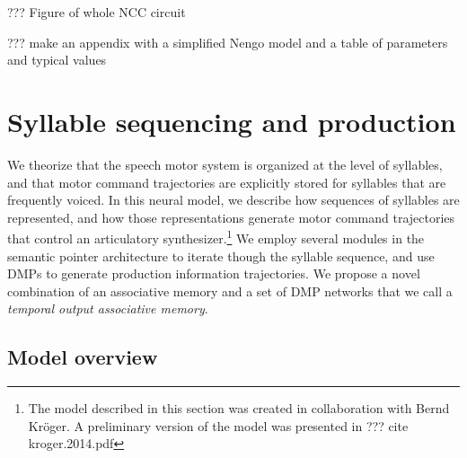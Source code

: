 ??? Figure of whole NCC circuit


??? make an appendix with a simplified Nengo model
and a table of parameters and typical values

\section{Syllable sequencing and production}


We theorize that the speech motor system
is organized at the level of syllables,
and that motor command trajectories are explicitly stored
for syllables that are frequently voiced.
In this neural model,
we describe how sequences of syllables are represented,
and how those representations
generate motor command trajectories
that control an articulatory synthesizer.\footnote{
  The model described in this section was created
  in collaboration with Bernd Kr\"{o}ger.
  A preliminary version of the model was presented
  in ??? cite kroger.2014.pdf}
We employ several modules in the semantic pointer architecture
to iterate though the syllable sequence,
and use DMPs to generate production information trajectories.
We propose a novel combination of an associative memory
and a set of DMP networks
that we call a \textit{temporal output associative memory}.

\subsection{Model overview}

